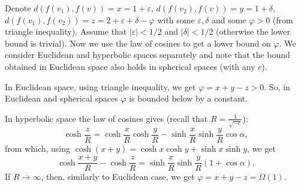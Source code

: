 \documentclass{article} %
\newcommand{\ph}[1]{\textcolor{blue}{#1}}
\newcommand{\lt}[1]{\textcolor{red}{#1}}
\begin{document}
Denote $d(f(v_1),f(v)) = x = 1 + \varepsilon$, $d(f(v_2),f(v)) = y = 1 + \delta$, $d(f(v_1),f(v_2)) = z = 2 + \varepsilon + \delta - \varphi$ with some $\varepsilon, \delta$ and some $\varphi > 0$ (from triangle inequality). Assume that $|\varepsilon| < 1/2$ and $|\delta| < 1/2$ (otherwise the lower bound is trivial). Now we use the law of cosines to get a lower bound on $\varphi$.
We consider Euclidean and hyperbolic spaces separately and note that the bound obtained in Euclidean space also holds in spherical spaces (with any $c$).

In Euclidean space, using triangle inequality, we get  $\varphi = x + y - z > 0$. So, in Euclidean and spherical spaces $\varphi$ is bounded below by a constant.

In hyperbolic space the law of cosines gives 
(recall that $R = \frac{1}{\sqrt{-c}}$):
\[
\cosh \frac{z}{R} = \cosh \frac{x}{R} \cosh \frac{y}{R} - \sinh \frac{x}{R} \sinh \frac{y}{R} \cos \alpha,
\]
from which, using $\cosh(x+y) =\cosh x\cosh y+\sinh x\sinh y$, we get 
\[
\cosh \frac{x+y}{R} - \cosh \frac{z}{R} = \sinh \frac{x}{R} \sinh \frac{y}{R} (1 + \cos \alpha). %
\]
If $R \to \infty$, then, similarly to Euclidean case, we get $\varphi = x + y - z = \Omega(1)$. 

\end{document}
